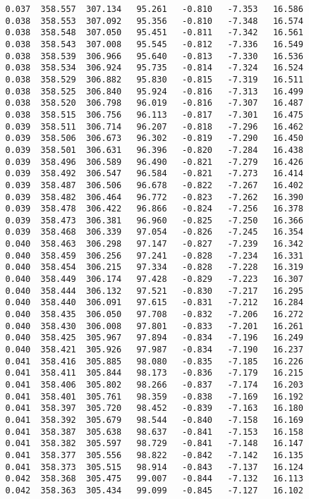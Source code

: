 \begin{verbatim}
   0.037  358.557  307.134   95.261   -0.810   -7.353   16.586
   0.038  358.553  307.092   95.356   -0.810   -7.348   16.574
   0.038  358.548  307.050   95.451   -0.811   -7.342   16.561
   0.038  358.543  307.008   95.545   -0.812   -7.336   16.549
   0.038  358.539  306.966   95.640   -0.813   -7.330   16.536
   0.038  358.534  306.924   95.735   -0.814   -7.324   16.524
   0.038  358.529  306.882   95.830   -0.815   -7.319   16.511
   0.038  358.525  306.840   95.924   -0.816   -7.313   16.499
   0.038  358.520  306.798   96.019   -0.816   -7.307   16.487
   0.038  358.515  306.756   96.113   -0.817   -7.301   16.475
   0.039  358.511  306.714   96.207   -0.818   -7.296   16.462
   0.039  358.506  306.673   96.302   -0.819   -7.290   16.450
   0.039  358.501  306.631   96.396   -0.820   -7.284   16.438
   0.039  358.496  306.589   96.490   -0.821   -7.279   16.426
   0.039  358.492  306.547   96.584   -0.821   -7.273   16.414
   0.039  358.487  306.506   96.678   -0.822   -7.267   16.402
   0.039  358.482  306.464   96.772   -0.823   -7.262   16.390
   0.039  358.478  306.422   96.866   -0.824   -7.256   16.378
   0.039  358.473  306.381   96.960   -0.825   -7.250   16.366
   0.039  358.468  306.339   97.054   -0.826   -7.245   16.354
   0.040  358.463  306.298   97.147   -0.827   -7.239   16.342
   0.040  358.459  306.256   97.241   -0.828   -7.234   16.331
   0.040  358.454  306.215   97.334   -0.828   -7.228   16.319
   0.040  358.449  306.174   97.428   -0.829   -7.223   16.307
   0.040  358.444  306.132   97.521   -0.830   -7.217   16.295
   0.040  358.440  306.091   97.615   -0.831   -7.212   16.284
   0.040  358.435  306.050   97.708   -0.832   -7.206   16.272
   0.040  358.430  306.008   97.801   -0.833   -7.201   16.261
   0.040  358.425  305.967   97.894   -0.834   -7.196   16.249
   0.040  358.421  305.926   97.987   -0.834   -7.190   16.237
   0.041  358.416  305.885   98.080   -0.835   -7.185   16.226
   0.041  358.411  305.844   98.173   -0.836   -7.179   16.215
   0.041  358.406  305.802   98.266   -0.837   -7.174   16.203
   0.041  358.401  305.761   98.359   -0.838   -7.169   16.192
   0.041  358.397  305.720   98.452   -0.839   -7.163   16.180
   0.041  358.392  305.679   98.544   -0.840   -7.158   16.169
   0.041  358.387  305.638   98.637   -0.841   -7.153   16.158
   0.041  358.382  305.597   98.729   -0.841   -7.148   16.147
   0.041  358.377  305.556   98.822   -0.842   -7.142   16.135
   0.041  358.373  305.515   98.914   -0.843   -7.137   16.124
   0.042  358.368  305.475   99.007   -0.844   -7.132   16.113
   0.042  358.363  305.434   99.099   -0.845   -7.127   16.102

\end{verbatim}
